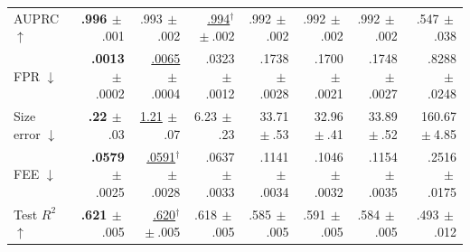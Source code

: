\begin{table}[t]
\begin{tabular*}{\textwidth}{@{\extracolsep{\fill}}lrrrrrrr@{}}
\quad AUPRC $\uparrow$ & \cellcolor{best}\textbf{.996}{\tiny$\,\pm$.001} & .993{\tiny$\,\pm$.002} & \underline{.994}$^\dagger${\tiny$\,\pm$.002} & .992{\tiny$\,\pm$.002} & .992{\tiny$\,\pm$.002} & .992{\tiny$\,\pm$.002} & .547{\tiny$\,\pm$.038}\\
\quad FPR $\downarrow$ & \cellcolor{best}\textbf{.0013}{\tiny$\,\pm$.0002} & \underline{.0065}{\tiny$\,\pm$.0004} & .0323{\tiny$\,\pm$.0012} & .1738{\tiny$\,\pm$.0028} & .1700{\tiny$\,\pm$.0021} & .1748{\tiny$\,\pm$.0027} & .8288{\tiny$\,\pm$.0248}\\
\quad Size error $\downarrow$ & \cellcolor{best}\textbf{.22}{\tiny$\,\pm$.03} & \underline{1.21}{\tiny$\,\pm$.07} & 6.23{\tiny$\,\pm$.23} & 33.71{\tiny$\,\pm$.53} & 32.96{\tiny$\,\pm$.41} & 33.89{\tiny$\,\pm$.52} & 160.67{\tiny$\,\pm$4.85}\\
\quad FEE $\downarrow$ & \cellcolor{best}\textbf{.0579}{\tiny$\,\pm$.0025} & \underline{.0591}$^\dagger${\tiny$\,\pm$.0028} & .0637{\tiny$\,\pm$.0033} & .1141{\tiny$\,\pm$.0034} & .1046{\tiny$\,\pm$.0032} & .1154{\tiny$\,\pm$.0035} & .2516{\tiny$\,\pm$.0175}\\
\quad Test $R^2$ $\uparrow$ & \cellcolor{best}\textbf{.621}{\tiny$\,\pm$.005} & \underline{.620}$^\dagger${\tiny$\,\pm$.005} & .618{\tiny$\,\pm$.005} & .585{\tiny$\,\pm$.005} & .591{\tiny$\,\pm$.005} & .584{\tiny$\,\pm$.005} & .493{\tiny$\,\pm$.012}\\
\bottomrule
\end{tabular*}
\end{table}
